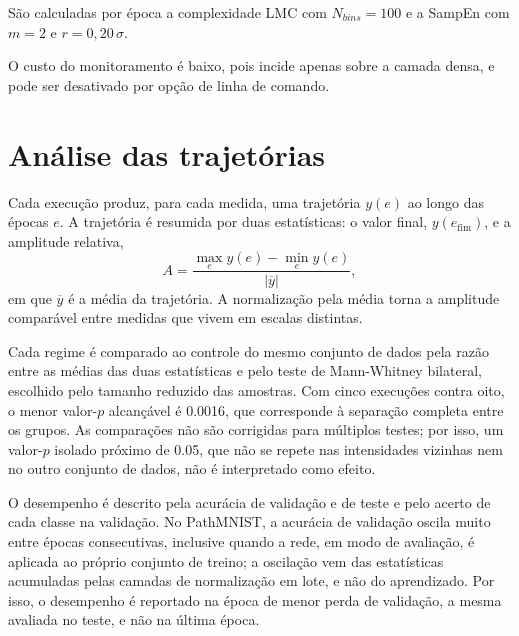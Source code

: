 São calculadas por época a complexidade LMC com $N_{bins} = 100$ e a
SampEn com $m = 2$ e $r = 0{,}20\,\sigma$.

O custo do monitoramento é baixo, pois incide apenas sobre a camada densa, e pode
ser desativado por opção de linha de comando.

\section{Análise das trajetórias}
\label{sec:analise}

Cada execução produz, para cada medida, uma trajetória $y(e)$ ao longo das
épocas $e$. A trajetória é resumida por duas estatísticas: o valor final,
$y(e_{\mathrm{fim}})$, e a amplitude relativa,
\begin{equation}
    A = \frac{\max_e y(e) - \min_e y(e)}{\left|\overline{y}\right|},
    \label{eq:amplitude}
\end{equation}
em que $\overline{y}$ é a média da trajetória. A normalização pela média torna
a amplitude comparável entre medidas que vivem em escalas distintas.

Cada regime é comparado ao controle do mesmo conjunto de dados pela razão entre
as médias das duas estatísticas e pelo teste de Mann-Whitney bilateral,
escolhido pelo tamanho reduzido das amostras. Com cinco execuções contra oito,
o menor valor-$p$ alcançável é \num{0,0016}, que corresponde à separação
completa entre os grupos. As comparações não são corrigidas para múltiplos
testes; por isso, um valor-$p$ isolado próximo de \num{0,05}, que não se repete
nas intensidades vizinhas nem no outro conjunto de dados, não é interpretado
como efeito.

O desempenho é descrito pela acurácia de validação e de teste e pelo acerto de
cada classe na validação. No PathMNIST, a acurácia de validação oscila muito
entre épocas consecutivas, inclusive quando a rede, em modo de avaliação, é
aplicada ao próprio conjunto de treino; a oscilação vem das estatísticas
acumuladas pelas camadas de normalização em lote, e não do aprendizado. Por
isso, o desempenho é reportado na época de menor perda de validação, a mesma
avaliada no teste, e não na última época.
